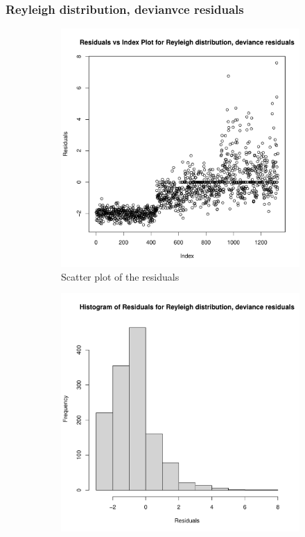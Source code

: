 \documentclass[12pt,a4paper,twoside]{article}
\begin{document}
\subsubsection{Reyleigh distribution, devianvce residuals}
\label{sssec:reyleighdeviance}
\begin{figure}[!ht]
    \begin{subfigure}{.45\textwidth}
        \centering
        \includegraphics[width=\linewidth]{img/reyleigh_residuals_deviance.pdf}
        \caption{Scatter plot of the residuals}
        \label{fig:reyleighdeviancescatter}
    \end{subfigure}
    \begin{subfigure}{.45\textwidth}
        \centering
        \includegraphics[width=\linewidth]{img/reyleigh_residuals_deviance_hist.pdf}

\end{subfigure}
\end{figure}
\end{document}
